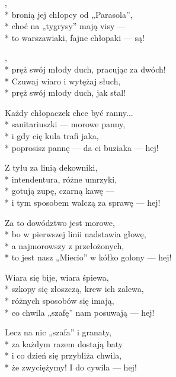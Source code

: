 \begin{lyrics}[longestline={to jest nasz „Miecio” w kółko golony — hej!}]

,\\*
bronią jej chłopcy od „Parasola”,\\*
choć na „tygrysy” mają visy —\\*
to warszawiaki, fajne chłopaki — są!

\begin{chorus}
,\\*
pręż swój młody duch, pracując za dwóch!\\*
Czuwaj wiaro i wytężaj słuch,\\*
pręż swój młody duch, jak stal!
\end{chorus}

Każdy chłopaczek chce być ranny...\\*
sanitariuszki — morowe panny,\\*
i gdy cię kula trafi jaka,\\*
poprosisz pannę — da ci buziaka — hej!

\chorusref

Z tyłu za linią dekowniki,\\*
intendentura, różne umrzyki,\\*
gotują zupę, czarną kawę —\\*
i tym sposobem walczą za sprawę — hej!

\chorusref

Za to dowództwo jest morowe,\\*
bo w pierwszej linii nadstawia głowę,\\*
a najmorowszy z przełożonych,\\*
to jest nasz „Miecio” w kółko golony — hej!

\chorusref

Wiara się bije, wiara śpiewa,\\*
szkopy się złoszczą, krew ich zalewa,\\*
różnych sposobów się imają,\\*
co chwila „szafę” nam posuwają — hej!

\chorusref

Lecz na nic „szafa” i granaty,\\*
za każdym razem dostają baty\\*
i co dzień się przybliża chwila,\\*
że zwyciężymy! I do cywila — hej!

\chorusref
\end{lyrics}



